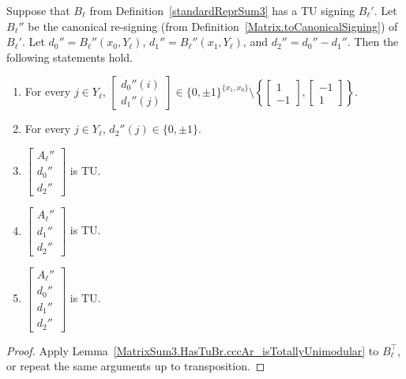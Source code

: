 \begin{lemma}
    \label{MatrixSum3.HasTuBr.dddAl_isTotallyUnimodular}
    \leanok
    Suppose that $B_{\ell}$ from Definition~\ref{standardReprSum3} has a TU signing $B_{\ell}'$. Let $B_{\ell}''$ be the canonical re-signing (from Definition~\ref{Matrix.toCanonicalSigning}) of $B_{\ell}'$. Let $d_{0}'' = B_{\ell}'' (x_{0}, Y_{\ell})$, $d_{1}'' = B_{\ell}'' (x_{1}, Y_{\ell})$, and $d_{2}'' = d_{0}'' - d_{1}''$. Then the following statements hold.
    \begin{enumerate}
        \item\label{item:tss_Blp_d01} For every $j \in Y_{\ell}$, $\begin{bmatrix} d_{0}'' (i) \\ d_{1}'' (j) \end{bmatrix} \in \{0, \pm 1\}^{\{x_{1}, x_{0}\}} \setminus \left\{ \begin{bmatrix} 1 \\ -1 \end{bmatrix}, \begin{bmatrix} -1 \\ 1 \end{bmatrix} \right\}$.
        \item\label{item:tss_Blp_d2} For every $j \in Y_{\ell}$, $d_{2}'' (j) \in \{0, \pm 1\}$.
        \item\label{item:tss_Blp_tu1} $\begin{bmatrix} A_{\ell}'' \\ d_{0}'' \\ d_{2}'' \end{bmatrix}$ is TU.
        \item\label{item:tss_Blp_tu2} $\begin{bmatrix} A_{\ell}'' \\ d_{1}'' \\ d_{2}'' \end{bmatrix}$ is TU.
        \item\label{item:tss_Blp_tu3} $\begin{bmatrix} A_{\ell}'' \\ d_{0}'' \\ d_{1}'' \\ d_{2}'' \end{bmatrix}$ is TU.
    \end{enumerate}
\end{lemma}

\begin{proof}
    \leanok
    Apply Lemma~\ref{MatrixSum3.HasTuBr.cccAr_isTotallyUnimodular} to $B_{\ell}^{\top}$, or repeat the same arguments up to transposition.
\end{proof}

